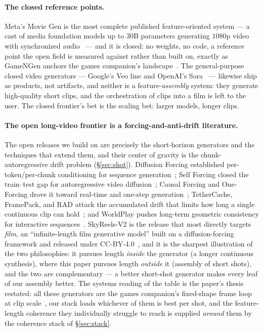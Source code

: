 \documentclass[11pt]{article}
\begin{document}
\paragraph{The closed reference points.} Meta's Movie Gen is the most complete published feature-oriented system
--- a cast of media foundation models up to $30$B parameters generating $1080$p video with synchronized
audio~\cite{moviegen} --- and it is closed: no weights, no code, a reference point the open field is measured
against rather than built on, exactly as GameNGen anchors the games companion's landscape~\cite{games}. The
general-purpose closed video generators --- Google's Veo line and OpenAI's Sora~\cite{sora} --- likewise ship as
products, not artifacts, and neither is a feature-\emph{assembly} system: they generate high-quality short clips,
and the orchestration of clips into a film is left to the user. The closed frontier's bet is the scaling bet:
larger models, longer clips.

\paragraph{The open long-video frontier is a forcing-and-anti-drift literature.} The open releases we build on are
precisely the short-horizon generators and the techniques that extend them, and their center of gravity is the
chunk-autoregressive drift problem (\S\ref{sec:shot}). Diffusion Forcing established per-token/per-chunk
conditioning for sequence generation~\cite{diffusionforcing}; Self Forcing closed the train--test gap for
autoregressive video diffusion~\cite{selfforcing}; Causal Forcing and One-Forcing drove it toward real-time and
one-step generation~\cite{causalforcing,oneforcing}; TetherCache, FramePack, and RAD attack the accumulated drift
that limits how long a single continuous clip can hold~\cite{tethercache,framepack,rad}; and WorldPlay pushes
long-term geometric consistency for interactive sequences~\cite{worldplay}. SkyReels-V2 is the release that most
directly targets \emph{film}, an ``infinite-length film generative model'' built on a diffusion-forcing framework
and released under CC-BY-4.0~\cite{skyreels2}, and it is the sharpest illustration of the two philosophies: it
pursues length \emph{inside} the generator (a longer continuous synthesis), where this paper pursues length
\emph{outside} it (assembly of short shots), and the two are complementary --- a better short-shot generator makes
every leaf of our assembly better. The systems reading of the table is the paper's thesis restated: all these
generators are the games companion's fixed-shape frame loop at clip scale~\cite{games}, our stack loads whichever
of them is best per shot, and the feature-length coherence they individually struggle to reach is supplied
\emph{around} them by the coherence stack of \S\ref{sec:stack}.
\end{document}
